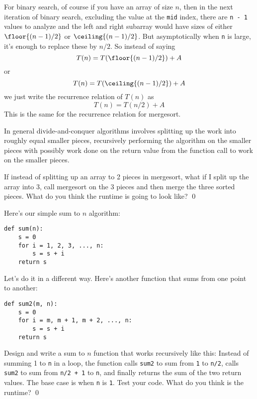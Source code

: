 For binary search, of course if you have an array of size $n$, then
in the next iteration of binary search, excluding the value at the \verb!mid! index,
there are \verb!n - 1! values to analyze
and the left and right subarray would have sizes of
either
$\floor{(n - 1)/2}$
or
$\ceiling{(n - 1)/2}$.
But asymptotically when \verb!n! is large,
it's enough to replace these by $n/2$.
So instead of saying 
\[
T(n) = T(\floor{(n - 1)/2}) + A
\]
or
\[
T(n) = T(\ceiling{(n - 1)/2}) + A
\]
we just write the recurrence relation of $T(n)$ as
\[
T(n) = T(n/2) + A
\]
This is the same for the recurrence relation for mergesort.

In general divide-and-conquer algorithms involves splitting
up the work into roughly equal smaller pieces, recursively
performing the algorithm on the smaller pieces with 
possibly work done on the return value from the function call 
to work on the smaller pieces.




\newpage
\begin{ex}
If instead of splitting up an array to 2 pieces in mergesort,
what if I split up the array into 3, call mergesort on the 3 pieces
and then merge the three sorted pieces.
What do you think the runtime is going to look like?
\qed
\end{ex}




\newpage
\begin{ex}
Here's our simple sum to $n$ algorithm:
\begin{Verbatim}[frame=single, fontsize=\footnotesize]
def sum(n):
    s = 0
    for i = 1, 2, 3, ..., n:
        s = s + i
    return s
\end{Verbatim}
Let's do it in a different way.
Here's another function that sums from one point to another:
\begin{Verbatim}[frame=single, fontsize=\footnotesize]
def sum2(m, n):
    s = 0
    for i = m, m + 1, m + 2, ..., n:
        s = s + i
    return s
\end{Verbatim}
Design and write a sum to $n$ function that works recursively like this:
Instead of summing 1 to \verb!n! in a loop, the function
calls \verb!sum2! to sum from \verb!1! to \verb!n/2!, 
calls \verb!sum2! to sum from 
\verb!n/2 + 1! to \verb!n!, 
and finally returns the sum of the two return values.
The base case is when \verb!n! is \verb!1!.
Test your code.
What do you think is the runtime?
\qed 
\end{ex}



